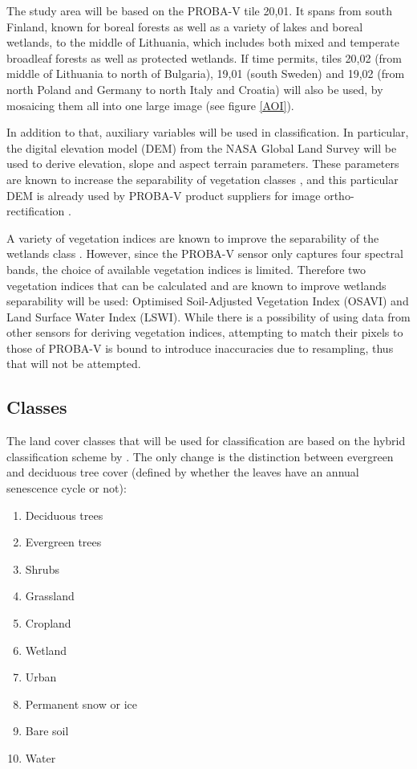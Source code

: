 \documentclass[a4paper,10pt]{article}
\begin{document}
The study area will be based on the PROBA-V tile 20,01. It spans from south Finland, known for boreal forests as well as a variety of lakes and boreal wetlands, to the middle of Lithuania, which includes both mixed and temperate broadleaf forests as well as protected wetlands. If time permits, tiles 20,02 (from middle of Lithuania to north of Bulgaria), 19,01 (south Sweden) and 19,02 (from north Poland and Germany to north Italy and Croatia) will also be used, by mosaicing them all into one large image (see figure \ref{AOI}).

In addition to that, auxiliary variables will be used in classification. In particular, the digital elevation model (DEM) from the NASA Global Land Survey will be used to derive elevation, slope and aspect terrain parameters. These parameters are known to increase the separability of vegetation classes \citep{burrough2001fuzzy}, and this particular DEM is already used by PROBA-V product suppliers for image ortho-rectification \citep{probavguide}.

A variety of vegetation indices are known to improve the separability of the wetlands class \citep{zhao2009indices,davranche2010wetland}. However, since the PROBA-V sensor only captures four spectral bands, the choice of available vegetation indices is limited. Therefore two vegetation indices that can be calculated and are known to improve wetlands separability will be used: Optimised Soil-Adjusted Vegetation Index (OSAVI) and Land Surface Water Index (LSWI). While there is a possibility of using data from other sensors for deriving vegetation indices, attempting to match their pixels to those of PROBA-V is bound to introduce inaccuracies due to resampling, thus that will not be attempted.

\subsection{Classes}

The land cover classes that will be used for classification are based on the hybrid classification scheme by \citep{see2015hybrid}. The only change is the distinction between evergreen and deciduous tree cover (defined by whether the leaves have an annual senescence cycle or not):
\begin{enumerate}
 \item Deciduous trees
 \item Evergreen trees
 \item Shrubs
 \item Grassland
 \item Cropland
 \item Wetland
 \item Urban
 \item Permanent snow or ice
 \item Bare soil
 \item Water
\end{enumerate}
\end{document}
